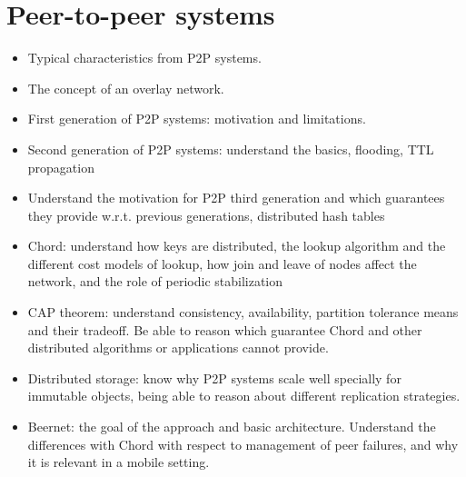 \documentclass[a4paper]{report}
\begin{document}
\chapter{Peer-to-peer systems}
\begin{itemize}
  \item Typical characteristics from P2P systems.
  \item The concept of an overlay network.
  \item First generation of P2P systems: motivation and limitations.
  \item Second generation of P2P systems: understand the basics, flooding, TTL propagation
  \item Understand the motivation for P2P third generation and which guarantees they
  provide w.r.t. previous generations, distributed hash tables
  \item Chord: understand how keys are distributed, the lookup algorithm and the different
  cost models of lookup, how join and leave of nodes affect the network, and the role of
  periodic stabilization
  \item CAP theorem: understand consistency, availability, partition tolerance means and their
  tradeoff. Be able to reason which guarantee Chord and other distributed algorithms or
  applications cannot provide.
  \item Distributed storage: know why P2P systems scale well specially for immutable objects,
  being able to reason about different replication strategies.
  \item Beernet: the goal of the approach and basic architecture. Understand the differences
  with Chord with respect to management of peer failures, and why it is relevant in a
  mobile setting.
\end{itemize}
\end{document}
